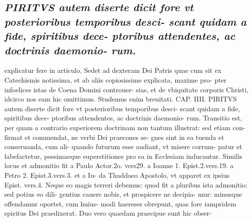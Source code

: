 \documentclass{article}
\begin{document}
\begin{pages}
\subsection*{\textit{PIRITVS autem diserte dicit fore vt posterioribus temporibus desci- scant quidam a fide, spiritibus dece- ptoribus attendentes, ac doctrinis daemonio- rum.}}explicatur fere in articulo, Sedet ad dexteram Dei Patris quae cum sit ex Catechismis notissima, et ab aliis copiosissime explicata, maxime pro- pter infoelices istas de Coena Domini controuer- sias, et de vbiquitate corporis Christi, idcirco nos eam hic omittimus. Studemus enim breuitati. CAP. IIII. PIRITVS autem diserte dicit fore vt posterioribus temporibus desci- scant quidam a fide, spiritibus dece- ptoribus attendentes, ac doctrinis daemonio- rum. Transitio est, per quam a contrario superiorem doctrinam non tantum illustrat: sed etiam con- firmat et commendat, ne verbi Dei praecones se- gnes sint in ea tuenda et conseruanda, cum ali- quando futurum esse audiant, vt misere corrum- patur et labefactetur, pessimaeque superstitiones pro ea in Ecclesiam inducantur. Similis locus et admonitio fit a Paulo Actor.2o. vers29. a Ioanne 1. Epist.2.vers.19. a Petro 2. Epist.3.vers.3. et a Iu- da Thaddaeo Apostolo, vt apparet ex ipsius Epist. vers.4. Neque eo magis terreri debemus: quod fit a pluribus ista admonitio: sed potius eo dili- gentius cauere nobis, et prospicere ne decipia- mur: minusque offendamur oportet, cum huius- modi haereses obrepunt, quas fore iampridem spiritus Dei praedixerat. Duo vero quaedam praecipue sunt hic obser-  \pend

\end{pages}
\end{document}
